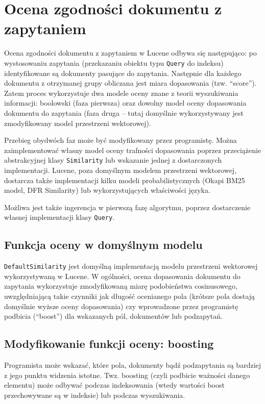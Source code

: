\chapter{Ocena zgodności dokumentu z zapytaniem}

Ocena zgodności dokumentu z zapytaniem w Lucene odbywa się następująco: po wystosowaniu zapytania (przekazaniu obiektu typu \texttt{Query} do indeksu) identyfikowane są dokumenty pasujące do zapytania. Następnie dla każdego dokumentu z otrzymanej grupy obliczana jest miara dopasowania (tzw. ``score''). Zatem proces wykorzystuje dwa modele oceny znane z teorii wyszukiwania informacji: boolowski (faza pierwsza) oraz dowolny model oceny dopasowania dokumentu do zapytania (faza druga -- tutaj domyślnie wykorzystywany jest zmodyfikowany model przestrzeni wektorowej). 

Przebieg obydwóch faz może być modyfikowany przez programistę. Można zaimplementować własny model oceny trafności dopasowania poprzez przeciążenie abstrakcyjnej klasy \texttt{Similarity} lub wskazanie jednej z dostarczonych implementacji. Lucene, poza domyślnym modelem przestrzeni wektorowej, dostarcza także implementacji kilku modeli probabilistycznych (Okapi BM25 model, DFR Similarity) lub wykorzystujących właściwości języka.

Możliwa jest także ingerencja w pierwszą fazę algorytmu, poprzez dostarczenie własnej implementacji klasy \texttt{Query}.

\section{Funkcja oceny w domyślnym modelu}

\texttt{DefaultSimilarity} jest domyślną implementacją modelu przestrzeni wektorowej wykorzystywaną w Lucene. W ogólności, ocena dopasowania dokumentu do zapytania wykorzystuje zmodyfikowaną miarę podobieństwa cosinusowego, uwzględniającą takie czynniki jak długość ocenianego pola (krótsze pola dostają domyślnie wyższe oceny dopasowania) czy wprowadzone przez programistę podbicia (``boost'') dla wskazanych pól, dokumentów lub podzapytań.

\section{Modyfikowanie funkcji oceny: boosting}

Programista może wskazać, które pola, dokumenty bądź podzapytania są bardziej z jego punktu widzenia istotne. Twz. boosting (czyli podbicie ważności danego elementu) może odbywać podczas indeksowania (wtedy wartości boost przechowywane są w indeksie) lub podczas wyszukiwania. 